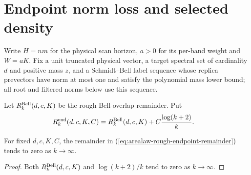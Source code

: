 \section{Endpoint norm loss and selected density}
\label{sec:arealaw-actual-endpoint-budget}

Write $H=nm$ for the physical scan horizon, $a>0$ for its per-band weight
and $W=aK$. Fix a unit truncated physical vector, a target spectral set of
cardinality $d$ and positive mass $z$, and a Schmidt--Bell label sequence
whose replica prevectors have norm at most one and satisfy the polynomial
mass lower bound; all root and filtered norms below use this sequence.

\begin{definition}
    \label{def:arealaw-rough-endpoint-remainder}
    \leanok
    Let $R_k^{\rm Bell}(d,c,K)$ be the rough Bell-overlap remainder.  Put
    \begin{align}
        R_k^{\rm end}(d,c,K,C)
         & =R_k^{\rm Bell}(d,c,K)+C\frac{\log(k+2)}k.
        \label{eq:arealaw-rough-endpoint-remainder}
    \end{align}
\end{definition}

\begin{lemma}
    \label{thm:arealaw-rough-endpoint-remainder-limit}
    \leanok
    For fixed $d,c,K,C$, the remainder in
    (\ref{eq:arealaw-rough-endpoint-remainder}) tends to zero as $k\to\infty$.
\end{lemma}
\begin{proof}
    \leanok
    Both $R_k^{\rm Bell}(d,c,K)$ and $\log(k+2)/k$ tend to zero as $k\to\infty$.
\end{proof}

